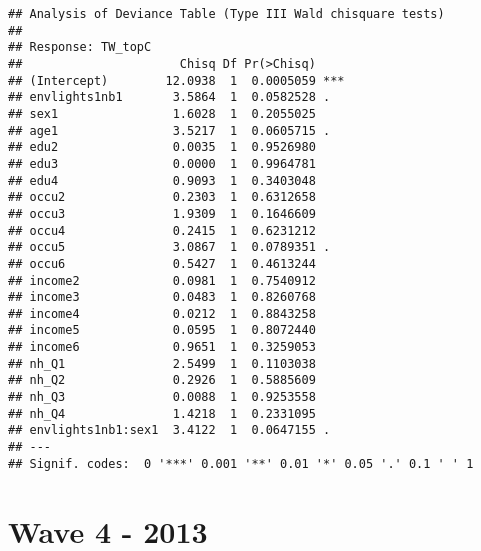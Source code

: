 \documentclass[
]{book}
\begin{document}
\begin{verbatim}
## Analysis of Deviance Table (Type III Wald chisquare tests)
## 
## Response: TW_topC
##                      Chisq Df Pr(>Chisq)    
## (Intercept)        12.0938  1  0.0005059 ***
## envlights1nb1       3.5864  1  0.0582528 .  
## sex1                1.6028  1  0.2055025    
## age1                3.5217  1  0.0605715 .  
## edu2                0.0035  1  0.9526980    
## edu3                0.0000  1  0.9964781    
## edu4                0.9093  1  0.3403048    
## occu2               0.2303  1  0.6312658    
## occu3               1.9309  1  0.1646609    
## occu4               0.2415  1  0.6231212    
## occu5               3.0867  1  0.0789351 .  
## occu6               0.5427  1  0.4613244    
## income2             0.0981  1  0.7540912    
## income3             0.0483  1  0.8260768    
## income4             0.0212  1  0.8843258    
## income5             0.0595  1  0.8072440    
## income6             0.9651  1  0.3259053    
## nh_Q1               2.5499  1  0.1103038    
## nh_Q2               0.2926  1  0.5885609    
## nh_Q3               0.0088  1  0.9253558    
## nh_Q4               1.4218  1  0.2331095    
## envlights1nb1:sex1  3.4122  1  0.0647155 .  
## ---
## Signif. codes:  0 '***' 0.001 '**' 0.01 '*' 0.05 '.' 0.1 ' ' 1
\end{verbatim}

\hypertarget{wave-4---2013}{%
\section{Wave 4 - 2013}\label{wave-4---2013}}
\end{document}
